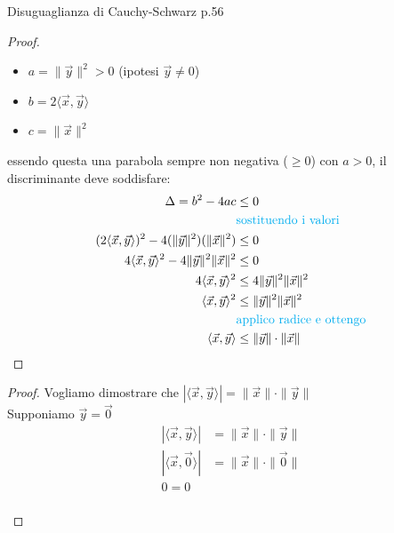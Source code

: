 \documentclass{article}  %
\begin{document}
\begin{theorem}{Disuguaglianza di Cauchy-Schwarz p.56}
\begin{proof}
		\begin{itemize}
			\item $a = \|\vec{y}\|^2 > 0$ (ipotesi $\vec{y} \neq 0$)
			\item $b = 2\langle \vec{x}, \vec{y} \rangle$
			\item $c = \|\vec{x}\|^2$
		\end{itemize}
		essendo questa una parabola sempre non negativa ($\geq 0$) con $a > 0$, il discriminante deve soddisfare:
		\begin{align*}
			\Delta = b^2-4ac                                                       & \leq 0                                            \\
			                                                                       & \textcolor{cyan}{\text{sostituendo i valori}}     \\
			(2 \langle \vec{x}, \vec{y} \rangle)^2-4(\|\vec{y}\|^2)(\|\vec{x}\|^2) & \leq 0                                            \\
			4 \langle \vec{x}, \vec{y} \rangle^2-4\|\vec{y}\|^2\|\vec{x}\|^2       & \leq 0                                            \\
			4 \langle \vec{x}, \vec{y} \rangle^2                                   & \leq 4\|\vec{y}\|^2\|\vec{x}\|^2                  \\
			\langle \vec{x}, \vec{y} \rangle^2                                     & \leq \|\vec{y}\|^2\|\vec{x}\|^2                   \\
			                                                                       & \textcolor{cyan}{\text{applico radice e ottengo}} \\
			\langle \vec{x}, \vec{y} \rangle                                       & \leq \|\vec{y}\| \cdot \|\vec{x}\|
		\end{align*}
	\end{proof}
	\begin{proof}
		Vogliamo dimostrare che $|\langle \vec{x}, \vec{y} \rangle| = \|\vec{x}\| \cdot \|\vec{y}\|$ \\
		\fbox{\textcolor{red}{Caso 1: $x \lor y = 0$}}
		Supponiamo $\vec{y}=\vec{0}$
		\begin{align*}
			|\langle \vec{x}, \vec{y} \rangle| & = \|\vec{x}\| \cdot \|\vec{y}\| \\
			|\langle \vec{x}, \vec{0} \rangle| & = \|\vec{x}\| \cdot \|\vec{0}\| \\
			0 = 0
		\end{align*}
		\fbox{\textcolor{red}{Caso 2: $x,y \neq 0$}} \\

\end{proof}
\end{theorem}
\end{document}
